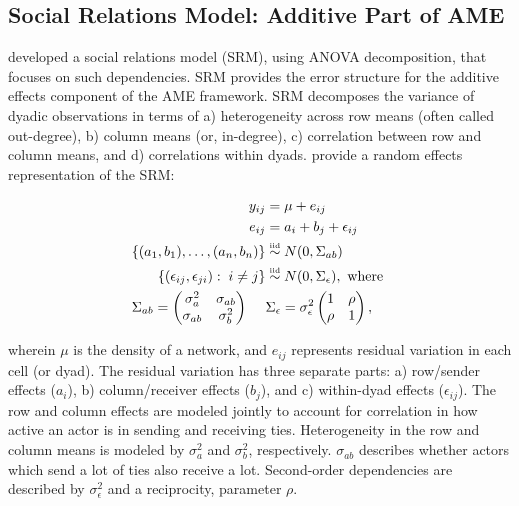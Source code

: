 \documentclass[12pt]{amsart}
\newcommand\simiid{\stackrel{\mathclap{\normalfont\mbox{\tiny{iid}}}}{\sim}}\usepackage{natbib}
\begin{document}
\subsection{\textbf{Social Relations Model: Additive Part of AME}}

\citet{warner:etal:1979} developed a social relations model (SRM), using ANOVA decomposition, that focuses on such dependencies. SRM provides the error structure for the additive effects component of the AME framework. SRM decomposes the variance of dyadic observations in terms of a) heterogeneity across row means (often called out-degree), b) column means (or, in-degree), c) correlation between row and column means, and d) correlations within dyads.  \citet{wong:1982,li:loken:2002} provide a random effects representation of the SRM:

\begin{align}
\begin{aligned}
	y_{ij} &= \mu + e_{ij} \\
	e_{ij} &= a_{i} + b_{j} + \epsilon_{ij} \\
	\{ (a_{1}, b_{1}), \ldots, (a_{n}, b_{n}) \} &\simiid N(0,\Sigma_{ab}) \\ 
	\{ (\epsilon_{ij}, \epsilon_{ji}) : \; i \neq j\} &\simiid N(0,\Sigma_{\epsilon}), \text{ where } \\
	\Sigma_{ab} = \begin{pmatrix} \sigma_{a}^{2} & \sigma_{ab} \\ \sigma_{ab} & \sigma_{b}^2   \end{pmatrix} \;\;\;\;\; &\Sigma_{\epsilon} = \sigma_{\epsilon}^{2} \begin{pmatrix} 1 & \rho \\ \rho & 1  \end{pmatrix},
\label{eqn:srmCov}
\end{aligned}
\end{align}

wherein $\mu$ is the density of a network, and $e_{ij}$ represents residual variation in each cell (or dyad). The residual variation has three separate parts: a)   row/sender effects ($a_{i}$), b)  column/receiver effects ($b_{j}$), and c) within-dyad effects ($\epsilon_{ij}$). The row and column effects are modeled jointly to account for correlation in how active an actor is in sending and receiving ties. Heterogeneity in the row and column means is modeled by $\sigma_{a}^{2}$ and $\sigma_{b}^{2}$, respectively.  $\sigma_{ab}$ describes whether actors which send a lot of ties also receive a lot. Second-order dependencies are described by $\sigma_{\epsilon}^{2}$ and a reciprocity, parameter $\rho$. 
\end{document}
